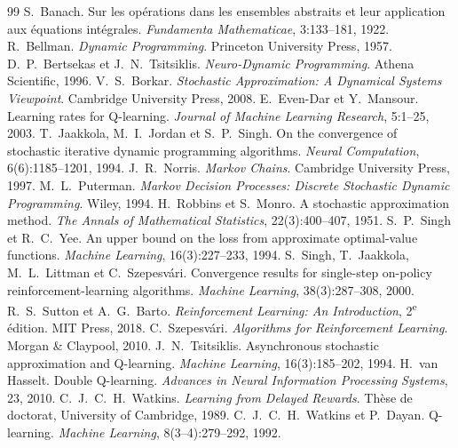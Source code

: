 \begin{thebibliography}{99}
 S.~Banach. Sur les opérations dans les ensembles abstraits et leur application aux équations intégrales. \emph{Fundamenta Mathematicae}, 3:133--181, 1922.
 R.~Bellman. \emph{Dynamic Programming}. Princeton University Press, 1957.
 D.~P.~Bertsekas et J.~N.~Tsitsiklis. \emph{Neuro-Dynamic Programming}. Athena Scientific, 1996.
 V.~S.~Borkar. \emph{Stochastic Approximation: A Dynamical Systems Viewpoint}. Cambridge University Press, 2008.
 E.~Even-Dar et Y.~Mansour. Learning rates for Q-learning. \emph{Journal of Machine Learning Research}, 5:1--25, 2003.
 T.~Jaakkola, M.~I.~Jordan et S.~P.~Singh. On the convergence of stochastic iterative dynamic programming algorithms. \emph{Neural Computation}, 6(6):1185--1201, 1994.
 J.~R.~Norris. \emph{Markov Chains}. Cambridge University Press, 1997.
 M.~L.~Puterman. \emph{Markov Decision Processes: Discrete Stochastic Dynamic Programming}. Wiley, 1994.
 H.~Robbins et S.~Monro. A stochastic approximation method. \emph{The Annals of Mathematical Statistics}, 22(3):400--407, 1951.
 S.~P.~Singh et R.~C.~Yee. An upper bound on the loss from approximate optimal-value functions. \emph{Machine Learning}, 16(3):227--233, 1994.
 S.~Singh, T.~Jaakkola, M.~L.~Littman et C.~Szepesvári. Convergence results for single-step on-policy reinforcement-learning algorithms. \emph{Machine Learning}, 38(3):287--308, 2000.
 R.~S.~Sutton et A.~G.~Barto. \emph{Reinforcement Learning: An Introduction}, 2\textsuperscript{e} édition. MIT Press, 2018.
 C.~Szepesvári. \emph{Algorithms for Reinforcement Learning}. Morgan \& Claypool, 2010.
 J.~N.~Tsitsiklis. Asynchronous stochastic approximation and Q-learning. \emph{Machine Learning}, 16(3):185--202, 1994.
 H.~van Hasselt. Double Q-learning. \emph{Advances in Neural Information Processing Systems}, 23, 2010.
 C.~J.~C.~H.~Watkins. \emph{Learning from Delayed Rewards}. Thèse de doctorat, University of Cambridge, 1989.
 C.~J.~C.~H.~Watkins et P.~Dayan. Q-learning. \emph{Machine Learning}, 8(3--4):279--292, 1992.
\end{thebibliography}
